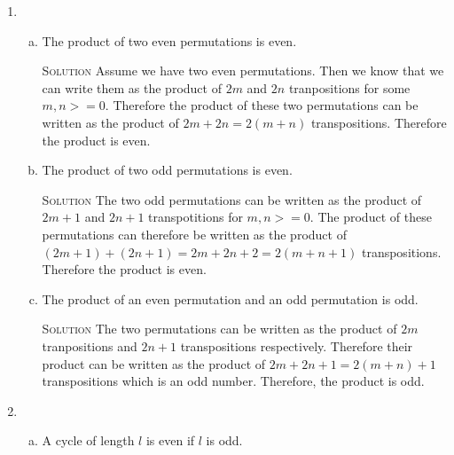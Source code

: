 \documentclass[twoside]{amsart}
\newcommand{\solution}{\textsc{Solution}\xspace}
\begin{document}
\begin{enumerate}[A.]
\begin{enumerate}[1]
\begin{enumerate}[(a)]
	  \item (12)(76)(345) \solution Even: (12)(76)(35)(34).

	  \item (1276)(3241)(7812)
	  \noindent \solution Odd: (16)(17)(12)(31)(34)(32)(72)(71)(78)

	  \item (123)(2345)(1357) \solution even + odd + odd = even:
	  (13) (12) (25) (24) (23) (17) (15) (13).

       \end{enumerate}
       \noindent Prove each of the following

       \item \begin{enumerate}[(a)]
	  \item The product of two even permutations is even.

	  \noindent \solution Assume we have two even permutations. Then
	  we know that we can write them as the product of $2m$ and $2n$
	  tranpositions for some $m,n >= 0$. Therefore the product of 
	  these two permutations can be written as the product of $2m 
	  + 2n = 2(m+n)$ transpositions. Therefore the product is even.

	  \item The product of two odd permutations is even.

	  \noindent \solution The two odd permutations can be written
	  as the product of $2m+1$ and $2n+1$ transpotitions for $m,n>=0$.
	  The product of these permutations can therefore be written
	  as the product of $(2m+1)+(2n+1)= 2m+2n+2 = 2(m+n+1)$ transpositions.
	  Therefore the product is even.

	  \item The product of an even permutation and an odd permutation
	  is odd.

	  \noindent \solution The two permutations can be written as
	  the product of $2m$ tranpositions and $2n+1$ transpositions
	  respectively. Therefore their product can be written
	  as the product of $2m+2n+1=2(m+n) + 1$ transpositions which
	  is an odd number. Therefore, the product is odd.
	  
       \end{enumerate}

       \item 
       \begin{enumerate}[(a)]

          \item A cycle of length $l$ is even if $l$ is odd.


\end{enumerate}
\end{enumerate}
\end{enumerate}
\end{document}
